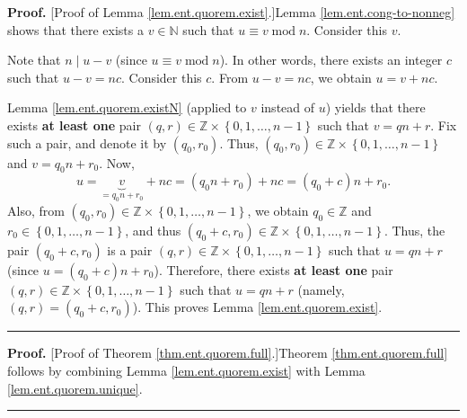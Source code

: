 \documentclass[numbers=enddot,12pt,final,onecolumn,notitlepage]{scrartcl}%
\numberwithin{exer}{subsection}
\theoremstyle{definition}
\newenvironment{proof}[1][Proof]{\noindent\textbf{#1.} }{\ \rule{0.5em}{0.5em}}
\begin{document}
\begin{proof}
[Proof of Lemma \ref{lem.ent.quorem.exist}.]Lemma \ref{lem.ent.cong-to-nonneg}
shows that there exists a $v\in\mathbb{N}$ such that $u\equiv
v\operatorname{mod}n$. Consider this $v$.

Note that $n\mid u-v$ (since $u\equiv v\operatorname{mod}n$). In other words,
there exists an integer $c$ such that $u-v=nc$. Consider this $c$. From
$u-v=nc$, we obtain $u=v+nc$.

Lemma \ref{lem.ent.quorem.existN} (applied to $v$ instead of $u$) yields that
there exists \textbf{at least one} pair $\left(  q,r\right)  \in
\mathbb{Z}\times\left\{  0,1,\ldots,n-1\right\}  $ such that $v=qn+r$. Fix
such a pair, and denote it by $\left(  q_{0},r_{0}\right)  $. Thus, $\left(
q_{0},r_{0}\right)  \in\mathbb{Z}\times\left\{  0,1,\ldots,n-1\right\}  $ and
$v=q_{0}n+r_{0}$. Now,%
\[
u=\underbrace{v}_{=q_{0}n+r_{0}}+nc=\left(  q_{0}n+r_{0}\right)  +nc=\left(
q_{0}+c\right)  n+r_{0}.
\]
Also, from $\left(  q_{0},r_{0}\right)  \in\mathbb{Z}\times\left\{
0,1,\ldots,n-1\right\}  $, we obtain $q_{0}\in\mathbb{Z}$ and $r_{0}%
\in\left\{  0,1,\ldots,n-1\right\}  $, and thus $\left(  q_{0}+c,r_{0}\right)
\in\mathbb{Z}\times\left\{  0,1,\ldots,n-1\right\}  $. Thus, the pair $\left(
q_{0}+c,r_{0}\right)  $ is a pair $\left(  q,r\right)  \in\mathbb{Z}%
\times\left\{  0,1,\ldots,n-1\right\}  $ such that $u=qn+r$ (since $u=\left(
q_{0}+c\right)  n+r_{0}$). Therefore, there exists \textbf{at least one} pair
$\left(  q,r\right)  \in\mathbb{Z}\times\left\{  0,1,\ldots,n-1\right\}  $
such that $u=qn+r$ (namely, $\left(  q,r\right)  =\left(  q_{0}+c,r_{0}%
\right)  $). This proves Lemma \ref{lem.ent.quorem.exist}.
\end{proof}

\begin{proof}
[Proof of Theorem \ref{thm.ent.quorem.full}.]Theorem \ref{thm.ent.quorem.full}
follows by combining Lemma \ref{lem.ent.quorem.exist} with Lemma
\ref{lem.ent.quorem.unique}.
\end{proof}
\end{document}
